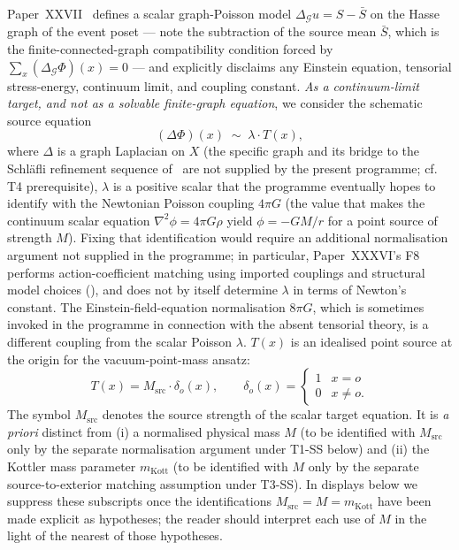 \documentclass[12pt]{article}
\theoremstyle{definition}
\theoremstyle{remark}
\newcommand{\Gcal}{\mathcal{G}}
\begin{document}
Paper~XXVII~\citep{SmartXXVII} defines a scalar graph-Poisson model $\Delta_\Gcal u = S - \bar S$ on the Hasse graph of the event poset --- note the subtraction of the source mean $\bar S$, which is the finite-connected-graph compatibility condition forced by $\sum_x (\Delta_\Gcal \Phi)(x) = 0$ --- and explicitly disclaims any Einstein equation, tensorial stress-energy, continuum limit, and coupling constant. \emph{As a continuum-limit target, and not as a solvable finite-graph equation}, we consider the schematic source equation
\begin{equation}\label{eq:discrete-poisson}
(\Delta \Phi)(x) \;\sim\; \lambda \cdot T(x),
\end{equation}
where $\Delta$ is a graph Laplacian on $X$ (the specific graph and its bridge to the Schl\"afli refinement sequence of~\citep{SmartXL} are not supplied by the present programme; cf.~\citep{SmartXL} T4 prerequisite), $\lambda$ is a positive scalar that the programme eventually hopes to identify with the Newtonian Poisson coupling $4\pi G$ (the value that makes the continuum scalar equation $\nabla^2 \phi = 4\pi G \rho$ yield $\phi = -GM/r$ for a point source of strength $M$). Fixing that identification would require an additional normalisation argument not supplied in the programme; in particular, Paper~XXXVI's F8 performs action-coefficient matching using imported couplings and structural model choices (\citealt{SmartXXXVI}), and does not by itself determine $\lambda$ in terms of Newton's constant. The Einstein-field-equation normalisation $8\pi G$, which is sometimes invoked in the programme in connection with the absent tensorial theory, is a different coupling from the scalar Poisson $\lambda$. $T(x)$ is an idealised point source at the origin for the vacuum-point-mass ansatz:
\begin{equation}
T(x) = M_{\mathrm{src}} \cdot \delta_o(x), \qquad \delta_o(x) = \begin{cases} 1 & x = o \\ 0 & x \ne o. \end{cases}
\end{equation}
The symbol $M_{\mathrm{src}}$ denotes the source strength of the scalar target equation. It is \emph{a priori} distinct from (i) a normalised physical mass $M$ (to be identified with $M_{\mathrm{src}}$ only by the separate normalisation argument under T1-SS below) and (ii) the Kottler mass parameter $m_{\mathrm{Kott}}$ (to be identified with $M$ only by the separate source-to-exterior matching assumption under T3-SS). In displays below we suppress these subscripts once the identifications $M_{\mathrm{src}} = M = m_{\mathrm{Kott}}$ have been made explicit as hypotheses; the reader should interpret each use of $M$ in the light of the nearest of those hypotheses.
\end{document}
